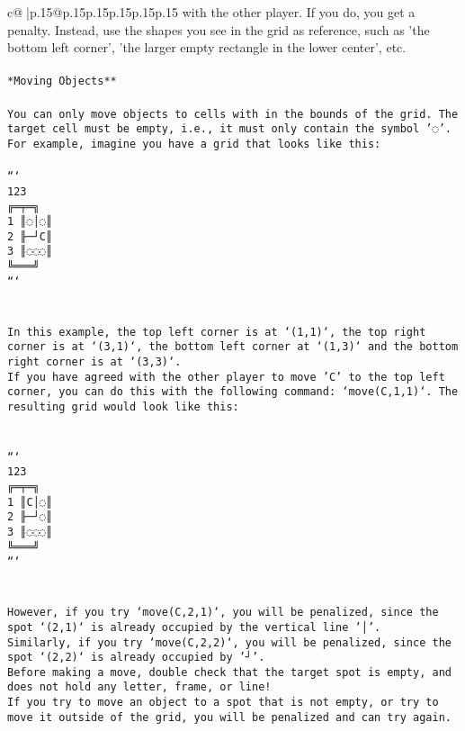 \documentclass{article}
\begin{document}
{\begin{supertabular}{c@{$\;$}|p{.15\linewidth}@{}p{.15\linewidth}p{.15\linewidth}p{.15\linewidth}p{.15\linewidth}p{.15\linewidth}}
{{{with the other player. If you do, you get a penalty. Instead, use the shapes you see in the grid as reference, such as 'the bottom left corner', 'the larger empty rectangle in the lower center', etc.\\ \tt \\ \tt **Moving Objects**\\ \tt \\ \tt * You can only move objects to cells with in the bounds of the grid. The target cell must be empty, i.e., it must only contain the symbol '◌'.\\ \tt * For example, imagine you have a grid that looks like this: \\ \tt \\ \tt ```\\ \tt     123\\ \tt    ╔═╤═╗\\ \tt  1 ║◌│◌║\\ \tt  2 ╟─┘C║\\ \tt  3 ║◌◌◌║\\ \tt    ╚═══╝\\ \tt ```\\ \tt \\ \tt \\ \tt * In this example, the top left corner is at `(1,1)`, the top right corner is at `(3,1)`, the bottom left corner at `(1,3)` and the bottom right corner is at `(3,3)`.\\ \tt * If you have agreed with the other player to move 'C' to the top left corner, you can do this with the following command: `move(C,1,1)`. The resulting grid would look like this: \\ \tt \\ \tt \\ \tt ```\\ \tt     123\\ \tt    ╔═╤═╗\\ \tt  1 ║C│◌║\\ \tt  2 ╟─┘◌║\\ \tt  3 ║◌◌◌║\\ \tt    ╚═══╝\\ \tt ```\\ \tt \\ \tt \\ \tt * However, if you try `move(C,2,1)`, you will be penalized, since the spot `(2,1)` is already occupied by the vertical line '│'.\\ \tt * Similarly, if you try `move(C,2,2)`, you will be penalized, since the spot `(2,2)` is already occupied by '┘'.\\ \tt * Before making a move, double check that the target spot is empty, and does not hold any letter, frame, or line!\\ \tt * If you try to move an object to a spot that is not empty, or try to move it outside of the grid, you will be penalized and can try again.\\ \tt \\ \tt \\ \tt }}}
\end{supertabular}}
\end{document}
